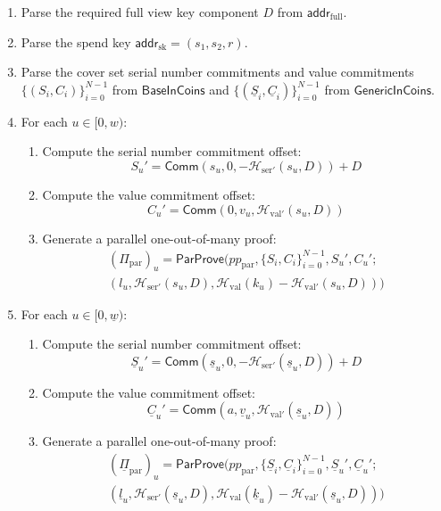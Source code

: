 \documentclass{article}
\newcommand{\func}[1]{\mathsf{#1}}
\newcommand{\addr}{\func{addr}}
\newcommand{\comm}{\func{Comm}}
\newcommand{\hash}{\mathcal{H}}
\begin{document}
\begin{enumerate}
    \item Parse the required full view key component $D$ from $\addr_{\text{full}}$.
    \item Parse the spend key $\addr_{\text{sk}} = (s_1, s_2, r)$.
    \item Parse the cover set serial number commitments and value commitments $\{(S_i, C_i)\}_{i=0}^{N-1}$ from $\func{BaseInCoins}$ and $\{(\underline{S}_i, \underline{C}_i)\}_{i=0}^{N-1}$ from $\func{GenericInCoins}$.
    \item For each $u \in [0,w)$:
    \begin{enumerate}
        \item Compute the serial number commitment offset: $$S_u' = \comm(s_u, 0, -\hash_{\text{ser}'}(s_u, D)) + D$$
        \item Compute the value commitment offset: $$C_u' = \comm(0, v_u, \hash_{\text{val}'}(s_u, D))$$
        \item Generate a parallel one-out-of-many proof:
        \begin{multline*}
        (\Pi_{\text{par}})_u = \func{ParProve}(pp_{\text{par}},\{S_i, C_i\}_{i=0}^{N-1}, S_u',C_u'; \\
        (l_u, \hash_{\text{ser}'}(s_u, D), \hash_{\text{val}}(k_u) - \hash_{\text{val}'}(s_u, D)))
        \end{multline*}
    \end{enumerate}
    \item For each $u \in [0,\underline{w})$:
    \begin{enumerate}
        \item Compute the serial number commitment offset: $$\underline{S}_u' = \comm(\underline{s}_u, 0, -\hash_{\text{ser}'}(\underline{s}_u, D)) + D$$
        \item Compute the value commitment offset: $$\underline{C}_u' = \comm(a, \underline{v}_u, \hash_{\text{val}'}(\underline{s}_u, D))$$
        \item Generate a parallel one-out-of-many proof:
        \begin{multline*}
        (\underline{\Pi}_{\text{par}})_u = \func{ParProve}(pp_{\text{par}},\{\underline{S}_i, \underline{C}_i\}_{i=0}^{N-1}, \underline{S}_u',\underline{C}_u'; \\
        (\underline{l}_u, \hash_{\text{ser}'}(\underline{s}_u, D), \hash_{\text{val}}(\underline{k}_u) - \hash_{\text{val}'}(\underline{s}_u, D)))
        \end{multline*}

\end{enumerate}
\end{enumerate}
\end{document}
